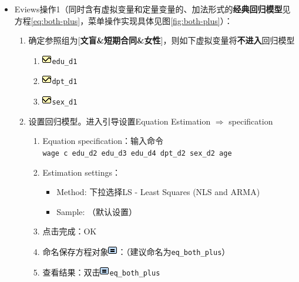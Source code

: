 \documentclass[12pt,(landscape,a4paper),(portrait,a4paper)]{article}
\providecommand{\tightlist}{%
  \setlength{\itemsep}{0pt}\setlength{\parskip}{0pt}}
\theoremstyle{definition}
\theoremstyle{definition}
\theoremstyle{definition}
\theoremstyle{remark}
\begin{document}
\begin{itemize}
\tightlist
\item
  Eviews操作1（同时含有虚拟变量和定量变量的、加法形式的\textbf{经典回归模型}见方程\eqref{eq:both-plus}，菜单操作实现具体见图\ref{fig:both-plus}）：

  \begin{enumerate}
  \def\labelenumi{\arabic{enumi})}
  \tightlist
  \item
    确定参照组为{[}\textbf{文盲\&短期合同\&女性}{]}，则如下虚拟变量将\textbf{不进入}回归模型

    \begin{enumerate}
    \def\labelenumii{\alph{enumii}.}
    \tightlist
    \item
      \includegraphics{picture/object/Series.png}\texttt{edu\_d1}
    \item
      \includegraphics{picture/object/Series.png}\texttt{dpt\_d1}
    \item
      \includegraphics{picture/object/Series.png}\texttt{sex\_d1}
    \end{enumerate}
  \item
    设置回归模型。进入引导设置Equation Estimation \(\Rightarrow\)
    specification

    \begin{enumerate}
    \def\labelenumii{\alph{enumii}.}
    \tightlist
    \item
      Equation
      specification：输入命令\texttt{wage\ c\ edu\_d2\ edu\_d3\ edu\_d4\ dpt\_d2\ sex\_d2\ age}
    \item
      Estimation settings：

      \begin{itemize}
      \tightlist
      \item
        Method: 下拉选择LS - Least Squares (NLS and ARMA)
      \item
        Sample: （默认设置）
      \end{itemize}
    \item
      点击完成：OK
    \item
      命名保存方程对象\includegraphics{picture/object/Equation.png}：（建议命名为\texttt{eq\_both\_plus}）
    \item
      查看结果：双击\includegraphics{picture/object/Equation.png}\texttt{eq\_both\_plus}
    \end{enumerate}
  \end{enumerate}
\end{itemize}
\end{document}
